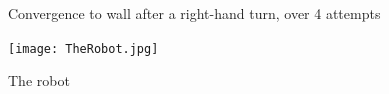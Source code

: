 \documentclass[a4paper,12pt]{article}
\begin{document}
\begin{figure}[ht]
\caption{Convergence to wall after a right-hand turn, over 4 attempts}
\label{fig:turn90}
\end{figure}


\begin{figure}[ht]
\centerline{\texttt{[image: TheRobot.jpg]}}
\caption{The robot}
\label{fig:theRobot}
\end{figure}

\FloatBarrier

%
%
\printbibliography
\end{document}
